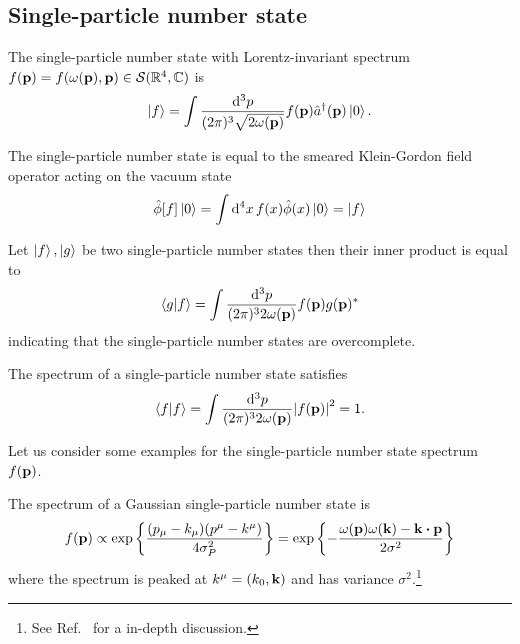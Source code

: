 \subsection{Single-particle number state}

\begin{definition}\label{def:single_particle_number_state}
	The single-particle number state with Lorentz-invariant spectrum $f(\vb{p})=f(\omega(\vb{p}),\vb{p})\in\mathcal{S}(\mathbb{R}^4,\mathbb{C})$ is
	\begin{equation}
		\ket{f}
		=
		\int\frac{\dd[3]{p}}{(2\pi)^3\sqrt{2\omega(\vb{p})}}
		f(\vb{p})
		\hat{a}^\dagger(\vb{p})
		\ket{0}
		.
	\end{equation}
\end{definition}
\begin{lemma}\label{thm:single_particle_number_state_smeared_kg}
	The single-particle number state is equal to the smeared Klein-Gordon field operator acting on the vacuum state
	\begin{equation}
		\hat\phi[f]
		\ket{0}
		=
		\int\dd[4]{x}
		f(x)
		\hat\phi(x)
		\ket{0}
		=
		\ket{f}
	\end{equation}
\end{lemma}
\begin{lemma}\label{th:single_particle_number_states_inner_product}
	Let $\ket{f},\ket{g}$ be two single-particle number states then their inner product is equal to
	\begin{equation}
		\braket{g}{f}
		=
		\int\frac{\dd[3]{p}}{(2\pi)^32\omega(\vb{p})}
		f(\vb{p})g(\vb{p})^*
	\end{equation}
	indicating that the single-particle number states are overcomplete.
\end{lemma}
\begin{lemma}\label{thm:single_particle_number_state_normalization}
	The spectrum of a single-particle number state satisfies
	\begin{equation}
		\bra{f}\ket{f}
		=
		\int\frac{\dd[3]{p}}{(2\pi)^32\omega(\vb{p})}
		\abs{f(\vb{p})}^2
		=
		1
		.
	\end{equation}
\end{lemma}
Let us consider some examples for the single-particle number state spectrum $f(\vb{p})$.
\begin{example}
	The spectrum of a Gaussian single-particle number state is
	\begin{equation}
		f(\vb{p})
		\propto
		\exp\left\{
			\frac{(p_\mu-k_\mu)(p^\mu-k^\mu)}{4\sigma_P^2}
		\right\}
		=
		\exp\left\{
			-
			\frac{\omega(\vb{p})\omega(\vb{k})-\vb{k}\vdot\vb{p}}{2\sigma^2}
		\right\}
		\label{eq:covariant_gaussian_spectrum}
	\end{equation}
	where the spectrum is peaked at $k^\mu=(k_0,\vb{k})$ and has variance $\sigma^2$.\footnote{See Ref.~\cite{Naumov2013,Naumov2009} for a in-depth discussion.}
\end{example}
